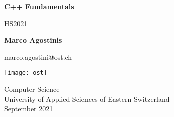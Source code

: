\begin{titlepage}
    \begin{center}
        \vspace*{1cm}
            
        \Huge
        \textbf{C++ Fundamentals}
            
        \vspace{0.5cm}
        \LARGE
        HS2021
            
        \vspace{1.5cm}
            
        \textbf{Marco Agostinis} 
        \vspace{0.5cm}
        
        \small{marco.agostini@ost.ch}
            
        \vfill
            
    
        \texttt{[image: ost]}
           
        \vspace{2cm}
           
        \Large
        Computer Science \\
        University of Applied Sciences of Eastern Switzerland \\
        September 2021
        

    \end{center}
\end{titlepage}

\tableofcontents
\newpage

